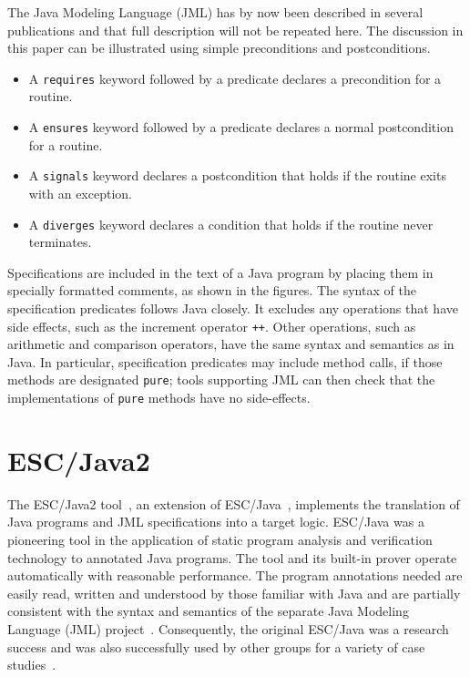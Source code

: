 \documentclass{sig-alternate}
\begin{document}
The Java Modeling Language (JML) has by now been described in several publications
\cite{jmlpapers,Leavens-Baker-Ruby99b,Leavens-Baker-Ruby02} and that full description 
will not be repeated here. 
 The discussion in this paper
can be illustrated using simple preconditions and postconditions.  
\setlength{\partopsep}{0in}\setlength{\parskip}{0in}\setlength{\itemsep}{0in}\setlength{\topsep}{0in}
\begin{itemize}
\setlength{\partopsep}{0in}\setlength{\parskip}{0in}\setlength{\itemsep}{0in}\setlength{\topsep}{0in}\item A \texttt{requires} keyword followed by a predicate declares a precondition for a routine.
\item A \texttt{ensures} keyword followed by a predicate declares a normal postcondition for a routine.
\item A \texttt{signals} keyword declares a postcondition that holds if the routine exits with an exception.
\item A \texttt{diverges} keyword declares a condition that holds if the routine never terminates.

\end{itemize}
Specifications are included in the text of a Java program by placing them in 
specially formatted comments, as shown in the figures.
The syntax of the specification predicates follows Java closely.  It excludes any operations 
that have side effects, such as the increment operator
 \texttt{++}.  Other operations, such as arithmetic and 
comparison operators, have the same syntax and semantics as in Java.  In particular, 
specification predicates may include method calls, if those methods are designated \texttt{pure};
tools supporting JML can then check that the implementations of \texttt{pure} methods have no side-effects.   

\section{ESC/Java2}

The ESC/Java2 tool~\cite{CokKiniry04}, an extension of ESC/Java~\cite{ESCJava,Flanagan-etal02},
 implements the translation of Java programs and JML specifications into
a target logic.   
ESC/Java
 was a pioneering tool in the
application of static program analysis and verification technology to
annotated Java programs.  The tool and its built-in
prover operate automatically with reasonable performance.  The 
program annotations needed are easily read, written and understood
by those familiar with Java and are partially consistent with the syntax
and semantics of the separate Java Modeling Language (JML)
project~\cite{jmlpapers,Leavens-etal00}.  Consequently, the original
ESC/Java was a research success
and was also successfully used by other groups for a variety of case
studies~\cite{HOP04}.
\end{document}

